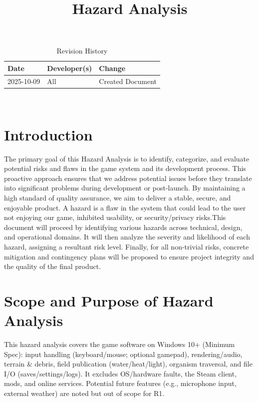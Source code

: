\documentclass{article}
\title{Hazard Analysis\\\progname}
\author{\authname}
\date{}
\begin{document}
\maketitle
\thispagestyle{empty}
\begin{table}[hp]
\caption{Revision History} \label{TblRevisionHistory}
\begin{tabularx}{\textwidth}{llX}
\toprule
\textbf{Date} & \textbf{Developer(s)} & \textbf{Change}\\
\midrule
2025-10-09 & All & Created Document\\
\bottomrule
\end{tabularx}
\end{table}

~\newpage
\tableofcontents
~\newpage

\section{Introduction}

The primary goal of this Hazard Analysis is to identify, categorize, and evaluate potential risks and flaws in the game system and its development process. This proactive approach ensures that we address potential issues before they translate into significant problems during development or post-launch. By maintaining a high standard of quality assurance, we aim to deliver a stable, secure, and enjoyable product. A hazard is a flaw in the system that could lead to the user not enjoying our game, inhibited usability, or security/privacy risks.This document will proceed by identifying various hazards across technical, design, and operational domains. It will then analyze the severity and likelihood of each hazard, assigning a resultant risk level. Finally, for all non-trivial risks, concrete mitigation and contingency plans will be proposed to ensure project integrity and the quality of the final product.\\

\section{Scope and Purpose of Hazard Analysis}

This hazard analysis covers the game software on Windows 10+ (Minimum Spec): input handling (keyboard/mouse; optional gamepad), rendering/audio, terrain \& debris, field publication (water/heat/light), organism traversal, and file I/O (saves/settings/logs). It excludes OS/hardware faults, the Steam client, mods, and online services. Potential future features (e.g., microphone input, external weather) are noted but out of scope for R1.\\
\end{document}
